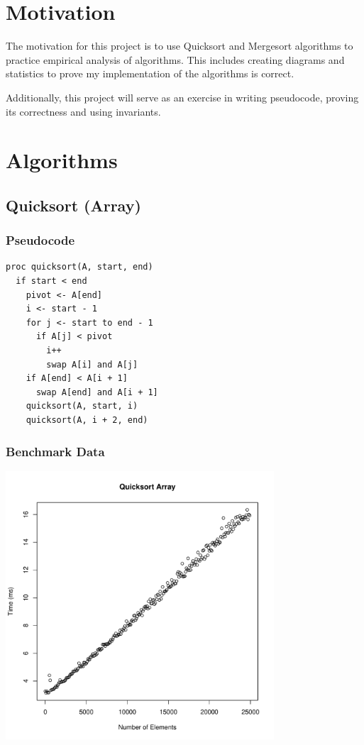 \documentclass[a4paper,12pt]{article}
\begin{document}
\section{Motivation}

The motivation for this project is to use Quicksort and Mergesort algorithms to practice empirical analysis of algorithms.
This includes creating diagrams and statistics to prove my implementation of the algorithms is correct.

Additionally, this project will serve as an exercise in writing pseudocode, proving its correctness and using invariants.

\section{Algorithms}
\subsection{Quicksort (Array)}
\subsubsection{Pseudocode}
\begin{verbatim}
proc quicksort(A, start, end)
  if start < end
    pivot <- A[end]
    i <- start - 1 
    for j <- start to end - 1
      if A[j] < pivot
        i++
        swap A[i] and A[j]
    if A[end] < A[i + 1]
      swap A[end] and A[i + 1]
    quicksort(A, start, i)
    quicksort(A, i + 2, end)
\end{verbatim}
\subsubsection{Benchmark Data}
\includegraphics[height=10cm]{quicksort_array}
\end{document}
